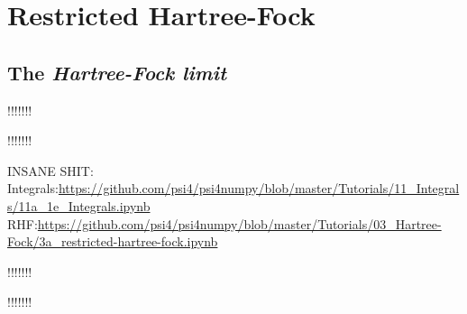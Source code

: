 \documentclass[../../master.tex]{subfiles}
\begin{document}
\section{Restricted Hartree-Fock}






\subsection{The \emph{Hartree-Fock limit} \label{HFlimit}}


!!!!!!!

!!!!!!!

INSANE SHIT: 
Integrals:\url{https://github.com/psi4/psi4numpy/blob/master/Tutorials/11_Integrals/11a_1e_Integrals.ipynb}
RHF:\url{https://github.com/psi4/psi4numpy/blob/master/Tutorials/03_Hartree-Fock/3a_restricted-hartree-fock.ipynb}

!!!!!!!

!!!!!!!















 
\end{document}

